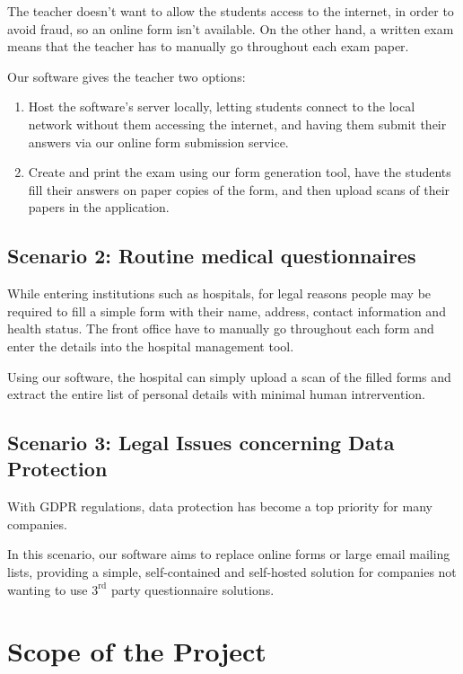 \documentclass[11pt, a4paper]{report}
\begin{document}
The teacher doesn't want to allow the students access to the internet, in order to avoid fraud, so an online form isn't available. On the other hand, a written exam means that the teacher has to manually go throughout each exam paper.

Our software gives the teacher two options:
\begin{enumerate}
    \item Host the software's server locally, letting students connect to the local network without them accessing the internet, and having them submit their answers via our online form submission service.
    \item Create and print the exam using our form generation tool, have the students fill their answers on paper copies of the form, and then upload scans of their papers in the application. 
\end{enumerate}

\subsection*{Scenario 2: Routine medical questionnaires}

While entering institutions such as hospitals, for legal reasons people may be required to fill a simple form with their name, address, contact information and health status.
The front office have to manually go throughout each form and enter the details into the hospital management tool.

Using our software, the hospital can simply upload a scan of the filled forms and extract the entire list of personal details with minimal human intrervention.

\subsection*{Scenario 3:  Legal Issues concerning Data Protection}

With GDPR regulations, data protection has become a top priority for many companies.

In this scenario, our software aims to replace online forms or large email mailing lists, providing a simple, self-contained and self-hosted solution for companies not wanting to use $3^\textrm{rd}$ party questionnaire solutions.

\section{Scope of the Project}
\end{document}
